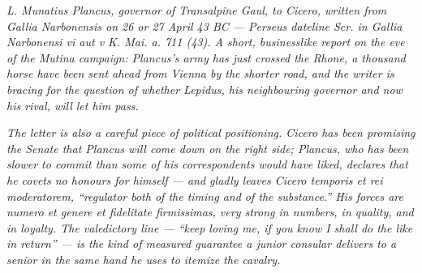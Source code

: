 
\textit{L. Munatius Plancus, governor of Transalpine Gaul, to
Cicero, written from Gallia Narbonensis on 26 or 27 April 43 BC
--- Perseus dateline \textit{Scr. in Gallia Narbonensi vi aut v
K. Mai. a. 711 (43)}. A short, businesslike report on the eve of
the Mutina campaign: Plancus's army has just crossed the Rhone,
a thousand horse have been sent ahead from Vienna by the shorter
road, and the writer is bracing for the question of whether
Lepidus, his neighbouring governor and now his rival, will let
him pass.}

\textit{The letter is also a careful piece of political
positioning. Cicero has been promising the Senate that Plancus
will come down on the right side; Plancus, who has been slower
to commit than some of his correspondents would have liked,
declares that he covets no honours for himself --- and gladly
leaves Cicero \textit{temporis et rei moderatorem}, ``regulator
both of the timing and of the substance.'' His forces are
\textit{numero et genere et fidelitate firmissimas}, very strong
in numbers, in quality, and in loyalty. The valedictory line ---
``keep loving me, if you know I shall do the like in return''
--- is the kind of measured guarantee a junior consular delivers
to a senior in the same hand he uses to itemize the cavalry.}
